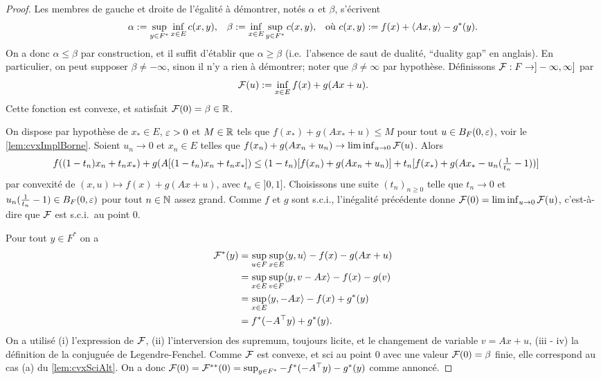 \begin{proof}
	Les membres de gauche et droite de l'égalité à démontrer, notés $\alpha$ et $\beta$, s'écrivent %
	\begin{align*}
		\alpha &:= \sup_{y \in F^*} \inf_{x \in E} c(x,y), & 
		\beta &:= \inf_{x \in E} \sup_{y \in F^*} c(x,y), &
		\text{où } c(x,y) := f(x) + \langle A x,y\rangle - g^*(y).
	\end{align*}
	On a donc $\alpha \leq \beta$ par construction, et il suffit d'établir que $\alpha \geq \beta$ (i.e.\ l'absence de saut de dualité, ``duality gap'' en anglais).
	En particulier, on peut supposer $\beta \neq - \infty$, sinon il n'y a rien à démontrer; noter que $\beta \neq \infty$ par hypothèse.
	Définissons $\mathcal{F} : F \to ]-\infty,\infty]$ par 
	\begin{equation*}
		\mathcal{F}(u) := \inf_{x \in E} f(x) + g(A x+u). 
	\end{equation*}
	Cette fonction est convexe, et satisfait $\mathcal{F}(0) = \beta \in \mathbb{R}$.
	
On dispose par hypothèse de $x_* \in E$, $\varepsilon > 0$ et $M \in \mathbb{R}$ tels que $f(x_*) + g(A x_* + u)  \leq M$ pour tout $u\in B_F(0,\varepsilon)$, voir le \cref{lem:cvxImplBorne}. 	
	Soient $u_n \to 0$ et $x_n\in E$ telles que $f(x_n) + g(A x_n +u_n) \to \liminf_{u \to 0} \mathcal{F}(u)$. Alors 
	\begin{equation*}
	\hspace{-0.5cm}
		f((1-t_n) x_n + t_n x_*) + g(A [(1-t_n) x_n + t_n x_*] )
		\leq (1-t_n) [f(x_n) + g(A x_n + u_n)] + t_n [f(x_*) + g(A x_* - u_n (\tfrac 1 {t_n}-1))]
	\end{equation*}
	par convexité de $(x,u) \mapsto f(x) + g(Ax + u)$, avec $t_n \in ]0,1]$. Choisissons une suite $(t_n)_{n\geq 0}$ telle que $t_n \to 0$ et $u_n (\frac 1 {t_n}-1) \in B_F(0,\varepsilon)$ pour tout $n \in \mathbb{N}$ assez grand. Comme $f$ et $g$ sont  s.c.i., l'inégalité précédente donne $\mathcal{F}(0) = \liminf_{u \to 0} \mathcal{F}(u)$, c'est-à-dire que $\mathcal{F}$ est s.c.i.\ au point $0$.  

	Pour tout $y \in F^*$ on a 
	\begin{align*}
		\mathcal{F}^*(y) &= \sup_{u\in F} \sup_{x \in E} \langle y,u\rangle -f(x) - g(Ax+u)\\
		&= \sup_{x \in E} \sup_{v \in F} \langle y,v-Ax\rangle - f(x) - g(v)\\
		&=\sup_{x \in E} \langle y, -Ax\rangle - f(x) + g^*(y)\\
		&= f^*(-A^\top y) + g^*(y). 
	\end{align*}
	On a utilisé (i) l'expression de $\mathcal{F}$, (ii) l'interversion des supremum, toujours licite, et le changement de variable $v=Ax+u$, (iii - iv) la définition de la conjuguée de Legendre-Fenchel.
	Comme $\mathcal{F}$ est convexe, et sci au point $0$ avec une valeur $\mathcal{F}(0) = \beta$ finie, elle correspond au cas (a) du \cref{lem:cvxSciAlt}. On a donc $\mathcal{F}(0) = \mathcal{F}^{**}(0) = \sup_{y \in F^*} - f^*(-A^\top y) - g^*(y)$ comme annoncé.
\end{proof}
